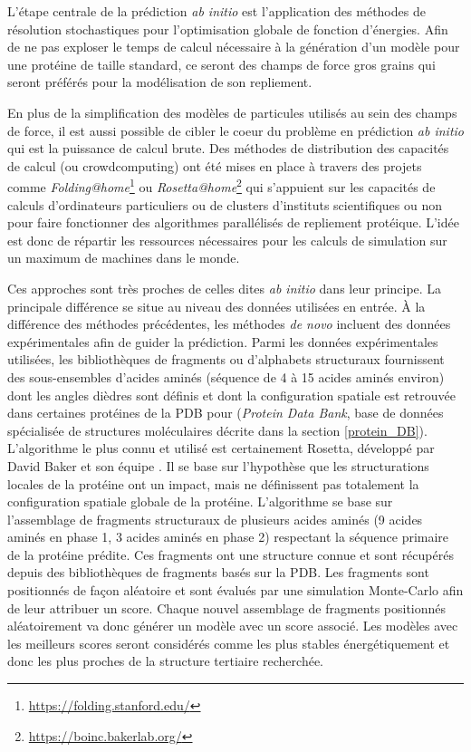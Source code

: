 L'étape centrale de la prédiction \textit{ab initio} est l'application des méthodes de résolution stochastiques pour l'optimisation globale de fonction d'énergies. Afin de ne pas exploser le temps de calcul nécessaire à la génération d'un modèle pour une protéine de taille standard, ce seront des champs de force gros grains qui seront préférés pour la modélisation de son repliement.

En plus de la simplification des modèles de particules utilisés au sein des champs de force, il est aussi possible de cibler le coeur du problème en prédiction \textit{ab initio} qui est la puissance de calcul brute. Des méthodes de distribution des capacités de calcul (ou crowdcomputing) ont été mises en place à travers des projets comme \textit{Folding@home}\footnote{\url{https://folding.stanford.edu/}} ou \textit{Rosetta@home}\footnote{\url{https://boinc.bakerlab.org/}} qui s'appuient sur les capacités de calculs d'ordinateurs particuliers ou de clusters d'instituts scientifiques ou non pour faire fonctionner des algorithmes parallélisés de repliement protéique. L'idée est donc de répartir les ressources nécessaires pour les calculs de simulation sur un maximum de machines dans le monde.


Ces approches sont très proches de celles dites \textit{ab initio} dans leur principe. La principale différence se situe au niveau des données utilisées en entrée. À la différence des méthodes précédentes, les méthodes \textit{de novo} incluent des données expérimentales afin de guider la prédiction. Parmi les données expérimentales utilisées, les bibliothèques de fragments ou d'alphabets structuraux fournissent des sous-ensembles d'acides aminés (séquence de 4 à 15 acides aminés environ) dont les angles dièdres sont définis et dont la configuration spatiale est retrouvée dans certaines protéines de la PDB pour (\textit{Protein Data Bank}, base de données spécialisée de structures moléculaires décrite dans la section \ref{protein_DB}). L'algorithme le plus connu et utilisé est certainement Rosetta, développé par David Baker et son équipe \cite{rohl2004protein}. Il se base sur l'hypothèse que les structurations locales de la protéine ont un impact, mais ne définissent pas totalement la configuration spatiale globale de la protéine. L'algorithme se base sur l'assemblage de fragments structuraux de plusieurs acides aminés (9 acides aminés en phase 1, 3 acides aminés en phase 2) respectant la séquence primaire de la protéine prédite. Ces fragments ont une structure connue et sont récupérés depuis des bibliothèques de fragments basés sur la PDB. Les fragments sont positionnés de façon aléatoire et sont évalués par une simulation Monte-Carlo afin de leur attribuer un score. Chaque nouvel assemblage de fragments positionnés aléatoirement va donc générer un modèle avec un score associé. Les modèles avec les meilleurs scores seront considérés comme les plus stables énergétiquement et donc les plus proches de la structure tertiaire recherchée.

